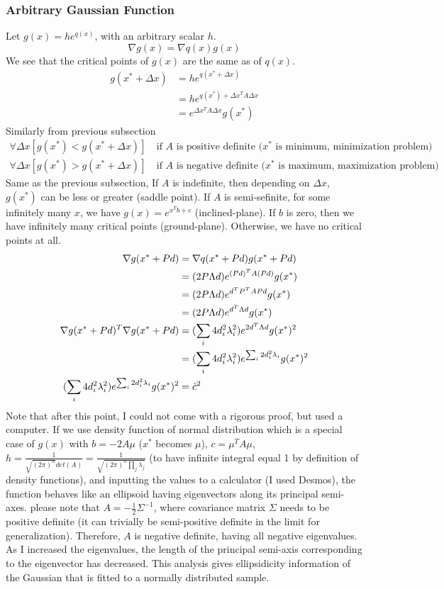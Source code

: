 \documentclass{article}
\numberwithin{equation}{subsection}
\begin{document}
\subsubsection{Arbitrary Gaussian Function}
Let $g(x) = he^{q(x)}$, with an arbitrary scalar $h$. 
\begin{equation}
    \nabla g(x) = \nabla q(x) g(x)
\end{equation}
We see that the critical points of $g(x)$ are the same as of $q(x)$. 
\begin{align}
    g(x^*+\Delta x) &= he^{q(x^*+\Delta x)}\\
     &= he^{q(x^*) + \Delta x^TA\Delta x}\\
     &= e^{\Delta x^TA\Delta x}g(x^*)
\end{align}
Similarly from previous subsection
\begin{align}
    \forall \Delta x [g(x^*) < g(x^*+\Delta x)] & \ \text{if $A$ is positive definite ($x^*$ is minimum, minimization problem)}\\
    \forall \Delta x [g(x^*) > g(x^*+\Delta x)] & \ \text{if $A$ is negative definite ($x^*$ is maximum, maximization problem)}
\end{align}
Same as the previous subsection, If $A$ is indefinite, then depending on $\Delta x$, $g(x^*)$ can be less or greater (saddle point). If $A$ is semi-sefinite, for some infinitely many $x$, we have $g(x) = e^{x^Tb+c}$ (inclined-plane). If $b$ is zero, then we have infinitely many critical points (ground-plane). Otherwise, we have no critical points at all.
\begin{align}
    \nabla g(x^*+Pd) &= \nabla q(x^*+Pd) g(x^*+Pd)\\
    &= (2P\Lambda d) e^{(Pd)^TA(Pd)}g(x^*)\\
    &= (2P\Lambda d) e^{d^TP^TAPd}g(x^*)\\
    &= (2P\Lambda d) e^{d^T\Lambda d}g(x^*)\\
    \nabla g(x^*+Pd)^T \nabla g(x^*+Pd) &= (\sum_i 4d_i^2\lambda_i^2)e^{2d^T\Lambda d}g(x^*)^2\\
    &= (\sum_i 4d_i^2\lambda_i^2)e^{\sum_i 2d_i^2\lambda_i}g(x^*)^2\\
    (\sum_i 4d_i^2\lambda_i^2)e^{\sum_i 2d_i^2\lambda_i}g(x^*)^2 &= \Tilde{c}^2
\end{align}
Note that after this point, I could not come with a rigorous proof, but used a computer.
If we use density function of normal distribution which is a special case of $g(x)$ with $b=-2A\mu$ ($x^*$ becomes $\mu$), $c=\mu^TA\mu$, $h = \frac{1}{\sqrt{(2\pi)^n}det(A)} = \frac{1}{\sqrt{(2\pi)^n\prod_j \lambda_j}}$ (to have infinite integral equal 1 by definition of density functions), and inputting the values to a calculator (I used Desmos), the function behaves like an ellipsoid having eigenvectors along its principal semi-axes. please note that $A=-\frac{1}{2}\Sigma^{-1}$, where covariance matrix $\Sigma$ needs to be positive definite (it can trivially be semi-positive definite in the limit for generalization). Therefore, $A$ is negative definite, having all negative eigenvalues. As I increased the eigenvalues, the length of the principal semi-axis corresponding to the eigenvector has decreased. 
This analysis gives ellipsidicity information of the Gaussian that is fitted to a normally distributed sample. 
\end{document}
